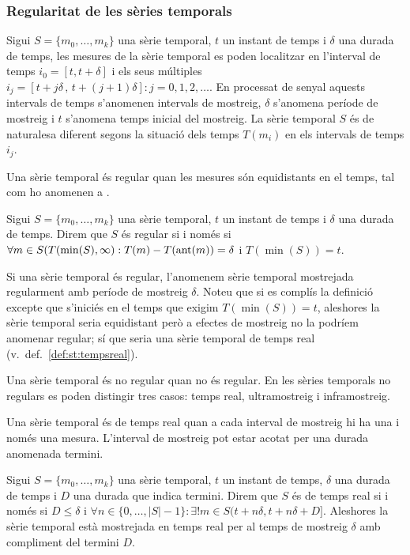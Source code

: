 \subsubsection{Regularitat de les sèries temporals} 

Sigui $S=\{m_0,\ldots,m_k\}$ una sèrie temporal, $t$ un instant de
temps i $\delta$ una durada de temps, les mesures de la sèrie temporal
es poden localitzar en l'interval de temps $i_0=[t,t+\delta]$ i els
seus múltiples $i_j=[t+j\delta \,,\, t+(j+1)\delta]: j=0,1,2,\ldots$.
En processat de senyal aquests intervals de temps s'anomenen intervals
de mostreig, $\delta$ s'anomena període de mostreig i $t$ s'anomena
temps inicial del mostreig.  La sèrie temporal $S$ és de naturalesa
diferent segons la situació dels temps $T(m_i)$ en els intervals de
temps $i_j$.

Una sèrie temporal és regular quan les mesures són equidistants en el
temps, tal com ho anomenen a \cite{last:hetland}.

\begin{definition}
  Sigui $S=\{m_0,\ldots,m_k\}$ una sèrie temporal, $t$ un instant de
  temps i $\delta$ una durada de temps. Direm que $S$ és regular si i
  només si $\forall m \in S(T(\min(S),\infty):T(m) - T(\operatorname*{ant}(m)) =
  \delta$ i $T(\min(S))=t$.
\end{definition}

Si una sèrie temporal és regular, l'anomenem sèrie temporal mostrejada
regularment amb període de mostreig $\delta$. Noteu que si es complís
la definició excepte que s'iniciés en el temps que exigim
$T(\min(S))=t$, aleshores la sèrie temporal seria equidistant però a
efectes de mostreig no la podríem anomenar regular; sí que seria una sèrie temporal de temps real (v.\ def.~\ref{def:st:tempsreal}).


Una sèrie temporal és no regular quan no és regular. 
En les sèries temporals no regulars es poden distingir tres casos: temps real, ultramostreig i inframostreig.

Una sèrie temporal és de temps real quan a cada interval de mostreig hi ha una i només una mesura. L'interval de mostreig pot estar acotat per una durada anomenada termini.

\begin{definition}\label{def:st:tempsreal}
  Sigui $S=\{m_0,\dotsc,m_k\}$ una sèrie temporal, $t$ un instant de
  temps, $\delta$ una durada de temps i $D$ una durada que indica
  termini. Direm que $S$ és de temps real si i només si $D\leq\delta$
  i $\forall n\in\{0,\ldots,|S|-1\}: \exists!m \in
  S(t+n\delta,t+n\delta+D]$.  Aleshores la sèrie temporal està
  mostrejada en temps real per al temps de mostreig $\delta$ amb
  compliment del termini $D$.
\end{definition}


